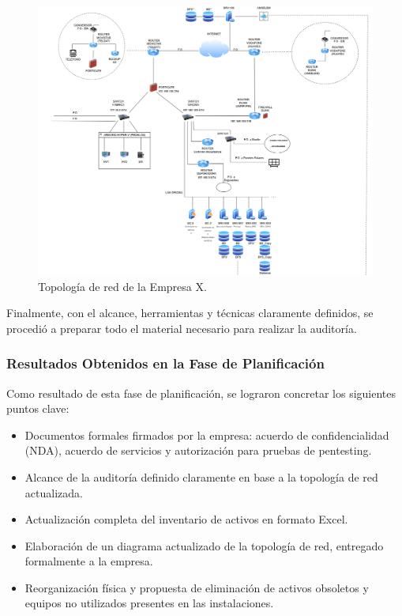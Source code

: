 \documentclass[a4paper, 11pt]{article}
\begin{document}
\begin{figure}[H]
  \centering
  \includegraphics[width=\textwidth]{images/topologia.png}
  \caption{Topología de red de la Empresa X.}
  \label{fig:topologia-red}
\end{figure}

\par\vspace{0.5cm}

Finalmente, con el alcance, herramientas y técnicas claramente definidos, se procedió a preparar todo el material necesario para realizar la auditoría. 
\par\vspace{0.5cm}




\subsubsection{Resultados Obtenidos en la Fase de Planificación}

Como resultado de esta fase de planificación, se lograron concretar los siguientes puntos clave:

\begin{itemize}
    \item Documentos formales firmados por la empresa: acuerdo de confidencialidad (NDA), acuerdo de servicios y autorización para pruebas de pentesting.
    \item Alcance de la auditoría definido claramente en base a la topología de red actualizada.
    \item Actualización completa del inventario de activos en formato Excel.
    \item Elaboración de un diagrama actualizado de la topología de red, entregado formalmente a la empresa.
    \item Reorganización física y propuesta de eliminación de activos obsoletos y equipos no utilizados presentes en las instalaciones.
\end{itemize}
\end{document}
